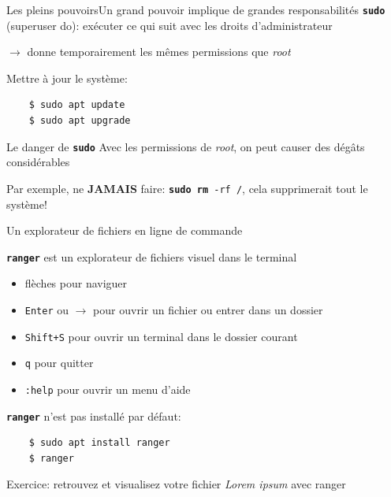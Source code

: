 \documentclass[
aspectratio=169 %
]{beamer}
\newcommand{\cmd}[1]{\texttt{\textbf{#1}}}
\begin{document}
\begin{frame}[fragile]{Les pleins pouvoirs}{Un grand pouvoir implique de grandes
        responsabilités}
    \cmd{sudo} (superuser do): exécuter ce qui suit avec les droits
    d'administrateur

    \smallskip
    \(\rightarrow\) donne temporairement les mêmes permissions que \textit{root}

    \bigskip
    Mettre à jour le système:
    \begin{lstlisting}
    $ sudo apt update
    $ sudo apt upgrade
    \end{lstlisting}

    \begin{alertblock}{Le danger de \cmd{sudo}}
        Avec les permissions de \textit{root}, on peut causer des dégâts
        considérables

        \smallskip
        Par exemple, ne \textbf{JAMAIS} faire: \texttt{\textbf{sudo rm} -rf /},
        cela supprimerait tout le système!
    \end{alertblock}
\end{frame}

\begin{frame}[fragile]{Un explorateur de fichiers en ligne de commande}

    \cmd{ranger} est un explorateur de fichiers visuel dans le terminal
    \begin{itemize}
        \item flèches pour naviguer
        \item \texttt{Enter} ou \(\rightarrow\) pour ouvrir un fichier ou entrer
              dans un dossier
        \item \texttt{Shift+S} pour ouvrir un terminal dans le dossier courant
        \item \texttt{q} pour quitter
        \item \texttt{:help} pour ouvrir un menu d'aide
    \end{itemize}

    \bigskip
    \cmd{ranger} n'est pas installé par défaut:
    \begin{lstlisting}
    $ sudo apt install ranger
    $ ranger
    \end{lstlisting}

    Exercice: retrouvez et visualisez votre fichier \textit{Lorem ipsum} avec
    ranger
\end{frame}
\end{document}
